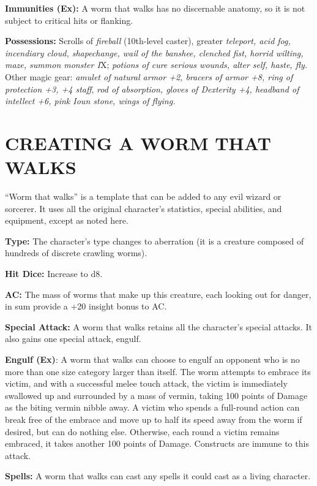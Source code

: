 \documentclass{article}
\begin{document}
{\textbf{Immunities (Ex): }A worm that walks has no discernable anatomy, so it is 
not subject to critical hits or flanking.

\textbf{Possessions: }Scrolls of \textit{fireball }(10th-level caster), greater 
\textit{teleport, acid fog, incendiary cloud, shapechange, wail of the banshee, 
clenched fist, horrid wilting, maze, summon monster I}X; \textit{potions of cure 
serious wounds, alter self, haste, fly. }Other magic gear: \textit{amulet of natural 
armor +2, bracers of armor +8, ring of protection +3, +4 staff}, \textit{rod of 
absorption, gloves of Dexterity +4, headband of intellect +6, pink Ioun stone, 
wings of flying.}

\vspace{12pt}
\section*{{\LARGE{}CREATING A WORM THAT WALKS}}

``Worm that walks'' is a template that can be added to any evil wizard or sorcerer. 
It uses all the original character's statistics, special abilities, and equipment, 
except as noted here. 

\textbf{Type: }The character's type changes to aberration (it is a creature composed 
of hundreds of discrete crawling worms). 

\textbf{Hit Dice:} Increase to d8. 

\textbf{AC:} The mass of worms that make up this creature, each looking out for 
danger, in sum provide a +20 insight bonus to AC. 

\textbf{Special Attack:} A worm that walks retains all the character's special 
attacks. It also gains one special attack, engulf. 

\textbf{Engulf (Ex)}: A worm that walks can choose to engulf an opponent who is 
no more than one size category larger than itself. The worm attempts to embrace 
its victim, and with a successful melee touch attack, the victim is immediately 
swallowed up and surrounded by a mass of vermin, taking 100 points of Damage as 
the biting vermin nibble away. A victim who spends a full-round action can break 
free of the embrace and move up to half its speed away from the worm if desired, 
but can do nothing else. Otherwise, each round a victim remains embraced, it takes 
another 100 points of Damage. Constructs are immune to this attack. 

\textbf{Spells:} A worm that walks can cast any spells it could cast as a living 
character. 

}
\end{document}
